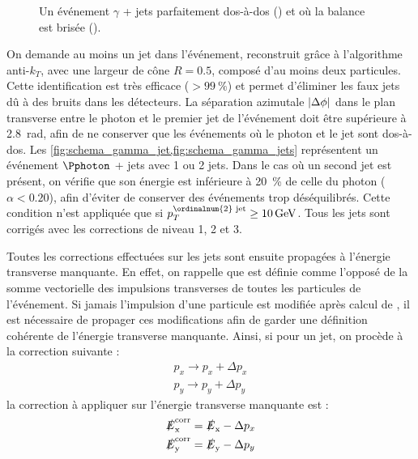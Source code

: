 \begin{figure}[tbp]
{{}}
  \caption{Un événement $\gamma$ + jets parfaitement dos-à-dos () et où la balance est brisée ().}
  \label{fig:schema_g_jet}
\end{figure}

On demande au moins un jet dans l'événement, reconstruit grâce à l'algorithme anti-$k_T$, avec une largeur de cône $R = \num{0.5}$, composé d'au moins deux particules. Cette identification est très efficace ($> \SI{99}{\%}$) et permet d'éliminer les faux jets dû à des bruits dans les détecteurs. La séparation azimutale $\lvert \Delta \phi \rvert$ dans le plan transverse entre le photon et le premier jet de l'événement doit être supérieure à \SI{2.8}{\radian}, afin de ne conserver que les événements où le photon et le jet sont dos-à-dos. Les \cref{fig:schema_gamma_jet,fig:schema_gamma_jets} représentent un événement $\Pphoton$ + jets avec 1 ou 2 jets. Dans le cas où un second jet est présent, on vérifie que son énergie est inférieure à \SI{20}{\%} de celle du photon ($\alpha < \num{0.20}$), afin d'éviter de conserver des événements trop déséquilibrés. Cette condition n'est appliquée que si $p_T^{\text{\ordinalnum{2} jet}} \geq \SI{10}{\GeV}$. Tous les jets sont corrigés avec les corrections de niveau 1, 2 et 3.

\label{page:met_propagation} Toutes les corrections effectuées sur les jets sont ensuite propagées à l'énergie transverse manquante. En effet, on rappelle que \met est définie comme l'opposé de la somme vectorielle des impulsions transverses de toutes les particules de l'événement. Si jamais l'impulsion d'une particule est modifiée après calcul de \met, il est nécessaire de propager ces modifications afin de garder une définition cohérente de l'énergie transverse manquante. Ainsi, si pour un jet, on procède à la correction suivante :
\begin{align*}
  p_x \rightarrow p_x + \Delta p_x \\
  p_y \rightarrow p_y + \Delta p_y
\end{align*}
la correction à appliquer sur l'énergie transverse manquante est :
\begin{align*}
  \slashed{E}_{\mathrm{x}}^{\text{corr}} &= \slashed{E}_{\mathrm{x}} - \Delta p_x \\
  \slashed{E}_{\mathrm{y}}^{\text{corr}} &= \slashed{E}_{\mathrm{y}} - \Delta p_y
\end{align*}

